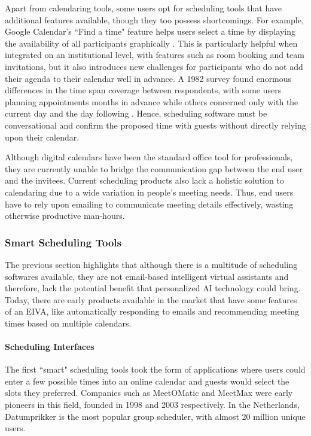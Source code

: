 \documentclass{article}
\begin{document}
Apart from calendaring tools, some users opt for scheduling tools that have additional features available, though they too possess shortcomings. For example, Google Calendar's ``Find a time" feature helps users select a time by displaying the availability of all participants graphically \cite{noauthor_google_2016}. This is particularly helpful when integrated on an institutional level, with features such as room booking and team invitations, but it also introduces new challenges for participants who do not add their agenda to their calendar well in advance. A 1982 survey found enormous differences in the time span coverage between respondents, with some users planning appointments months in advance while others concerned only with the current day and the day following \cite{kelley_how_1982}. Hence, scheduling software must be conversational and confirm the proposed time with guests without directly relying upon their calendar.

Although digital calendars have been the standard office tool for professionals, they are currently unable to bridge the communication gap between the end user and the invitees. Current scheduling products also lack a holistic solution to calendaring due to a wide variation in people's meeting needs. Thus, end users have to rely upon emailing to communicate meeting details effectively, wasting otherwise productive man-hours.

\subsubsection{Smart Scheduling Tools}

The previous section highlights that although there is a multitude of scheduling softwares available, they are not email-based intelligent virtual assistants and therefore, lack the potential benefit that personalized AI technology could bring. Today, there are early products available in the market that have some features of an EIVA, like automatically responding to emails and recommending meeting times based on multiple calendars.

\paragraph{Scheduling Interfaces}

The first ``smart" scheduling tools took the form of applications where users could enter a few possible times into an online calendar and guests would select the slots they preferred. Companies such as MeetOMatic and MeetMax were early pioneers in this field, founded in 1998 and 2003 respectively. In the Netherlands, Datumprikker is the most popular group scheduler, with almost 20 million unique users.
\end{document}
